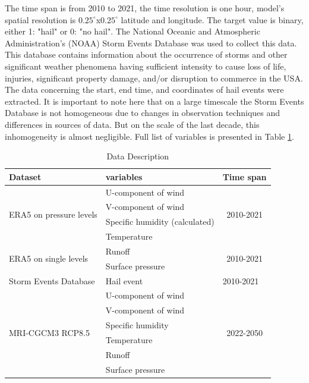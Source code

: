 \documentclass[conference]{IEEEtran}
\begin{document}
The time span is from 2010 to 2021, the time resolution is one hour, model's spatial resolution is $0.25^{\circ}$x$0.25^{\circ}$ latitude and longitude. The target value is binary, either 1: "hail" or 0: "no hail". The National Oceanic and Atmospheric Administration's (NOAA) Storm Events Database was used to collect this data. This database contains information about the occurrence of storms and other significant weather phenomena having sufficient intensity to cause loss of life, injuries, significant property damage, and/or disruption to commerce in the USA. The data concerning the start, end time, and coordinates of hail events were extracted. It is important to note here that on a large timescale the Storm Events Database is not homogeneous due to changes in observation techniques and differences in sources of data. But on the scale of the last decade, this inhomogeneity is almost negligible. Full list of variables is presented in Table \ref{tab: data-list}. 
\begin{table}[htbp]
\caption{Data Description}
\begin{center}
\begin{tabular}{|l|l|c|}
\hline
Dataset & variables & \multicolumn{1}{l|}{Time span} \\ \hline
\multirow{4}{*}{ERA5   on pressure levels} & U-component of wind & \multirow{4}{*}{2010-2021} \\ \cline{2-2}
 & V-component of wind &  \\ \cline{2-2}
 & Specific humidity (calculated) &  \\ \cline{2-2}
 & Temperature &  \\ \hline
\multirow{2}{*}{ERA5 on single levels} & Runoff & \multirow{2}{*}{2010-2021} \\ \cline{2-2}
 & Surface pressure &  \\ \hline
Storm Events   Database & Hail event & \multicolumn{1}{l|}{2010-2021} \\ \hline
\multirow{6}{*}{MRI-CGCM3 RCP8.5} & U-component of wind & \multirow{6}{*}{2022-2050} \\ \cline{2-2}
 & V-component of wind &  \\ \cline{2-2}
 & Specific humidity &  \\ \cline{2-2}
 & Temperature &  \\ \cline{2-2}
 & Runoff &  \\ \cline{2-2}
 & Surface pressure &  \\ \hline
\end{tabular}
\label{tab: data-list}
\end{center}
\end{table}
\end{document}

